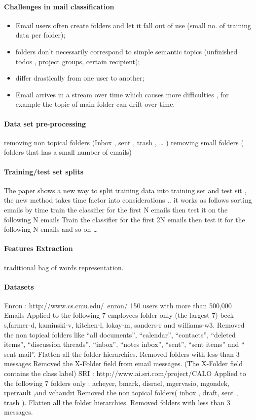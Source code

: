 \documentclass[12pt]{article}
\begin{document}
\paragraph{Challenges in mail classification}
\begin{itemize}
  \item Email users often create folders and let it fall out of use (small no. of training data per folder);
  \item folders don’t necessarily correspond to simple semantic topics (unfinished todos , project groups, certain recipient);
  \item differ drastically from one user to another;
  \item Email arrives in a stream over time which causes more difficulties , for example the topic of main folder can drift over time.
\end{itemize}


\paragraph{Data set pre-processing}
removing non topical folders (Inbox , sent , trash , … )
removing small folders ( folders that has a small number of emails)

\paragraph{Training/test set splits}
The paper shows a new way to split training data into training set and test sit , the new method takes time factor into considerations ..
it works as follows
sorting emails by time
train the classifier for the first N emails
then test it on the following N emails
Train the classifier for the first 2N emails
then test it for the following N emails
and so on …

\paragraph{Features Extraction}
traditional bag of words representation.

\paragraph{Datasets}
Enron : http://www.cs.cmu.edu/~enron/
150 users with more than 500,000 Emails
Applied to the following 7 employees folder only (the largest 7)
beck-s,farmer-d, kaminski-v, kitchen-l, lokay-m, sanders-r and williams-w3.
Removed the non topical folders like
“all documents”, “calendar”, “contacts”, “deleted items”, “discussion threads”, “inbox”, “notes inbox”, “sent”, “sent items” and “ sent mail”.
Flatten all the folder hierarchies.
Removed folders with less than 3 messages
Removed the X-Folder field from email messages. (The X-Folder field contains the class label)
SRI : http://www.ai.sri.com/project/CALO
Applied to the following 7 folders only : acheyer, bmark, disrael, mgervasio, mgondek, rperrault ,and vchaudri
Removed the non topical folders( inbox , draft, sent , trash ).
Flatten all the folder hierarchies.
Removed folders with less than 3 messages.
\end{document}
